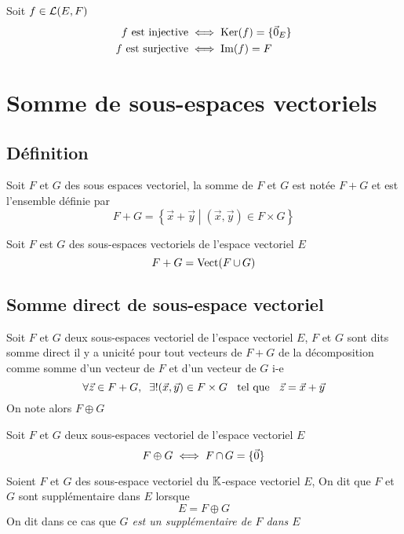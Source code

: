 \begin{prp}
Soit $f \in \operatorname{\mathcal{L}}(E, F)$
\begin{align*}
    f \text{ est injective} &\iff \operatorname{Ker}(f) = \{ \vec{0}_E \} \\
    f \text{ est surjective} &\iff \operatorname{Im}(f) = F
\end{align*}
\end{prp}


\section{Somme de sous-espaces vectoriels}


\subsection{Définition}

\begin{dfn}
Soit $F$ et $G$ des sous espaces vectoriel, la somme de $F$ et $G$ est
notée $F + G$ et est l'ensemble définie par
\[
    F + G = \left\{ \vec{x} + \vec{y} \middle|
    (\vec{x}, \vec{y}) \in F \times G \right\}
\]
\end{dfn}

\begin{prp}
Soit $F$ est $G$ des sous-espaces vectoriels de l'espace vectoriel $E$
\[
    F + G = \operatorname{Vect}( F \operatorname{\cup} G )
\]
\end{prp}


\subsection{Somme direct de sous-espace vectoriel}

\begin{dfn}
Soit $F$ et $G$ deux sous-espaces vectoriel de l'espace vectoriel $E$,
$F$ et $G$ sont dits somme direct \ssi il y a unicité pour tout vecteurs
de $F + G$ de la décomposition comme somme d'un vecteur de $F$ et d'un
vecteur de $G$ i-e
\[
    \forall \vec{z} \in F + G, \;\;
    \exists! (\vec{x}, \vec{y}) \in F \times G \;\;\text{ tel que }\;\;
    \vec{z} = \vec{x} + \vec{y}
\]
On note alors $F \oplus G$
\end{dfn}

\begin{prp}
Soit $F$ et $G$ deux sous-espaces vectoriel de l'espace vectoriel $E$
\[
    F \oplus G \iff F \operatorname{\cap} G = \{ \vec{0} \}
\]
\end{prp}

\begin{dfn}
Soient $F$ et $G$ des sous-espace vectoriel du $\mathbb{K}$-espace vectoriel $E$,
On dit que $F$ et $G$ sont supplémentaire dans $E$ lorsque
\[
    E = F \oplus G
\]
On dit dans ce cas que \emph{$G$ est un supplémentaire de $F$ dans $E$}
\end{dfn}

